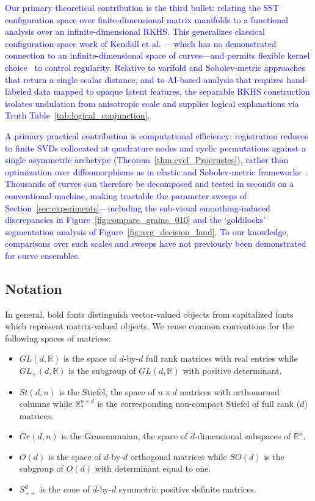 \documentclass[pdflatex,iicol]{sn-jnl}%
\theoremstyle{thmstyleone}%
\theoremstyle{thmstyletwo}%
\theoremstyle{thmstylethree}%
\begin{document}
\textcolor{blue}{Our primary theoretical contribution is the third bullet: relating the SST configuration space over finite-dimensional matrix manifolds to a functional analysis over an infinite-dimensional RKHS. This generalizes classical configuration-space work of Kendall et al.~\cite{kendall2009shape}---which has no demonstrated connection to an infinite-dimensional space of curves---and permits flexible kernel choice~\cite{micheli2013matrix} to control regularity. Relative to varifold and Sobolev-metric approaches~\cite{kaltenmark2017varifolds,pierson2022shape,bauer2017sobolev,hartman2023varigrad,hartman2021supervised} that return a single scalar distance, and to AI-based analysis that requires hand-labeled data mapped to opaque latent features, the separable RKHS construction isolates undulation from anisotropic scale and supplies logical explanations via Truth Table~\ref{tab:logical_conjunction}.}

\textcolor{blue}{A primary practical contribution is computational efficiency: registration reduces to finite SVDs collocated at quadrature nodes and cyclic permutations against a single asymmetric archetype (Theorem~\ref{thm:cycl_Procrustes}), rather than optimization over diffeomorphisms as in elastic and Sobolev-metric frameworks~\cite{srivastava2010shape,bauer2017sobolev,hartman2023varigrad}. Thousands of curves can therefore be decomposed and tested in seconds on a conventional machine, making tractable the parameter sweeps of Section~\ref{sec:experiments}---including the sub-visual smoothing-induced discrepancies in Figure~\ref{fig:compare_grains_010} and the `goldilocks' segmentation analysis of Figure~\ref{fig:avg_decision_land}. To our knowledge, comparisons over such scales and sweeps have not previously been demonstrated for curve ensembles.}

\subsection{Notation}
In general, bold fonts distinguish vector-valued objects from capitalized fonts which represent matrix-valued objects. We reuse common conventions for the following spaces of matrices:
\begin{itemize}
    \item $GL(d,\mathbb{R})$ is the space of $d$-by-$d$ full rank matrices with real entries while $GL_+(d,\mathbb{R})$ is the subgroup of $GL(d,\mathbb{R})$ with positive determinant.
    \item $St(d,n)$ is the Stiefel, the space of $n\times d$ matrices with orthonormal columns while $\mathbb{R}^{n \times d}_*$ is the corresponding non-compact Stiefel of full rank ($d$) matrices.
    \item $Gr(d,n)$ is the Grassmannian, the space of $d$-dimensional subspaces of $\mathbb{R}^n$.
    \item $O(d)$ is the space of $d$-by-$d$ orthogonal matrices while $SO(d)$ is the subgroup of $O(d)$ with determinant equal to one.
    \item $S^d_{++}$ is the cone of $d$-by-$d$ symmetric positive definite matrices.
\end{itemize}
\end{document}
